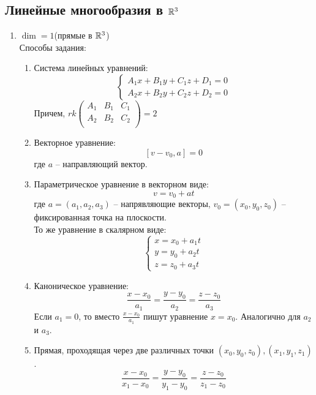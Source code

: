 \subsection*{Линейные многообразия в $\mathbb{R}^3$}
%
\begin{enumerate}
	\item $\dim = 1$(прямые в $\mathbb{R}^3$) \\
	Способы задания:
	\begin{enumerate}[label={1.\arabic*)}]
		\item Система линейных уравнений:
				\[
				\begin{cases}
				A_1x + B_1y + C_1z + D_1 = 0 \\
				A_2x + B_2y + C_2z + D_2 = 0
				\end{cases}
				\]
				Причем,
				$
				rk \begin{pmatrix}
							A_1 & B_1 & C_1 \\
							A_2 & B_2 & C_2 \\
						\end{pmatrix} 
					= 2
				$
		
		\item Векторное уравнение:
				$$[v - v_0, a] = 0$$ где $a$ -- направляющий вектор.
		\item Параметрическое уравнение в векторном виде:
				$$v = v_0 + at$$ где $a = (a_1, a_2, a_3)$ -- напрявляющие векторы, 
				$v_0 = (x_0 , y_0, z_0)$ -- фиксированная точка на плоскости. \\ 
				То же уравнение в скалярном виде:
				$$\begin{cases}
						x = x_0 + a_1t \\
						y = y_0 + a_2t \\
						z = z_0 + a_3t
					\end{cases}$$
		\item Каноническое уравнение:
				$$\frac{x - x_0}{a_1} = \frac{y - y_0}{a_2} = \frac{z - z_0}{a_3}$$
				Если $a_1 = 0$, то вместо $\displaystyle{\frac{x - x_0}{a_1}}$ пишут уравнение $x = x_0$. Аналогично для $a_2$ и $a_3$.
				
		\item Прямая, проходящая через две различных точки $(x_0, y_0, z_0), (x_1, y_1, z_1)$.
				$$\frac{x - x_0}{x_1 - x_0} = \frac{y - y_0}{y_1 - y_0} = \frac{z - z_0}{z_1 - z_0}$$
	\end{enumerate}


\end{enumerate}
